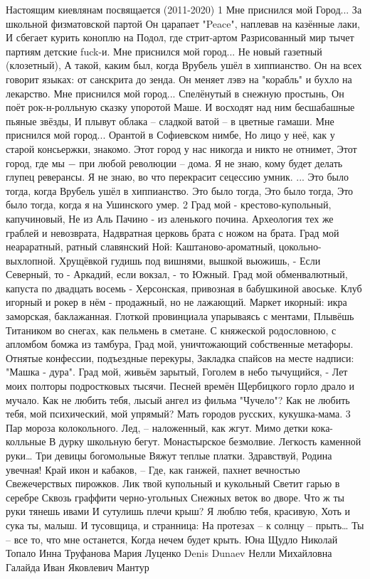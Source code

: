 Настоящим киевлянам посвящается (2011-2020)
1
Мне приснился мой Город... 
За школьной физматовской партой
Он царапает "Peace", наплевав на казённые лаки,
И сбегает курить коноплю на Подол, где стрит-артом
Разрисованный мир тычет партиям детские fuck-и.
Мне приснился мой город... 
Не новый газетный (клозетный),
А такой, каким был, когда Врубель ушёл в хиппианство.
Он на всех говорит языках: от санскрита до зенда.
Он меняет лэвэ на "корабль" и бухло на лекарство.
Мне приснился мой город...
Спелёнутый в снежную простынь,
Он поёт рок-н-ролльную сказку упоротой Маше.
И восходят над ним бесшабашные пьяные звёзды, 
И плывут облака – сладкой ватой – в цветные гамаши.
Мне приснился мой город...
Орантой в Софиевском нимбе,
Но лицо у неё, как у старой консьержки, знакомо.
Этот город у нас никогда и никто не отнимет,
Этот город, где мы − при любой революции – дома.
Я не знаю, кому будет делать глупец реверансы.
Я не знаю, во что перекрасит сецессию умник.
... Это было тогда, когда Врубель ушёл в хиппианство.
Это было тогда, 
Это было тогда,
Это было тогда,
когда я на Ушинского умер.
2
Град мой - крестово-купольный, капучиновый,
Не из Аль Пачино - из аленького почина.
Археология тех же граблей и невозврата,
Надвратная церковь брата с ножом на брата.
Град мой неараратный, ратный славянский Ной:
Каштаново-ароматный, цокольно-выхлопной.
Хрущёвкой гудишь под вишнями, вышкой вьюжишь, -
Если Северный, то - Аркадий, если вокзал, - то Южный.
Град мой обменвалютный, капуста по двадцать восемь -
Херсонская, привозная в бабушкиной авоське.
Клуб игорный и рокер в нём - продажный, но не лажающий.
Маркет икорный: икра заморская, баклажанная.
Глоткой провинциала упарываясь с ментами,
Плывёшь Титаником во снегах, как пельмень в сметане.
С княжеской родословною, с апломбом бомжа из тамбура,
Град мой, уничтожающий собственные метафоры.
Отнятые конфессии, подъездные перекуры,
Закладка спайсов на месте надписи: "Машка - дура".
Град мой, живьём зарытый, Гоголем в небо тычущийся, -
Лет моих полторы подростковых тысячи.
Песней времён Щербицкого горло драло и мучало.
Как не любить тебя, лысый ангел из фильма "Чучело"?
Как не любить тебя, мой психический, мой упрямый?
Мать городов русских, кукушка-мама.
3
Пар мороза колокольного.
Лед, – наложенный, как жгут.
Мимо детки кока-колльные
В дурку школьную бегут.
Монастырское безмолвие.
Легкость каменной руки…
Три девицы богомольные
Вяжут теплые платки.
Здравствуй, Родина увечная!
Край икон и кабаков, –
Где, как ганжей, пахнет вечностью
Свежечерствых пирожков.
Лик твой купольный и кукольный
Светит гарью в серебре
Сквозь граффити черно-угольных
Снежных веток во дворе.
Что ж ты руки тянешь ивами
И сутулишь плечи крыш?
Я люблю тебя, красивую,
Хоть и сука ты, малыш.
И тусовщица, и странница:
На протезах – к солнцу – прыть…
Ты – все то, что мне останется,
Когда нечем будет крыть.
Юна Щудло Николай Топало Инна Труфанова Мария Луценко Denis Dunaev Нелли Михайловна Галайда Иван Яковлевич Мантур


